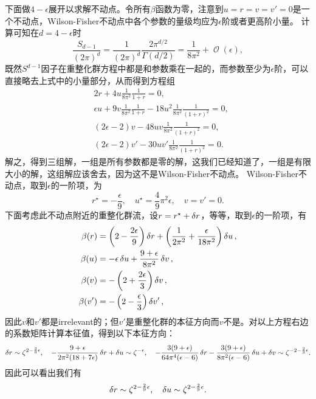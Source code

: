 \documentclass[hyperref, UTF8, a4paper]{ctexart}
\DeclareMathOperator{\bigO}{\mathcal{O}}
\begin{document}
下面做$4-\epsilon$展开以求解不动点。令所有$\beta$函数为零，注意到$u=r=v=v'=0$是一个不动点，Wilson-Fisher不动点中各个参数的量级均应为$\epsilon$阶或者更高阶小量。
计算可知在$d=4-\epsilon$时
\[
    \frac{S_{d-1}}{(2\pi)^d} = \frac{1}{(2\pi)^d} \frac{2 \pi^{d/2}}{\Gamma(d/2)} = \frac{1}{8 \pi^2} + \bigO(\epsilon),
\]
既然$S^{d-1}$因子在重整化群方程中都是和参数乘在一起的，而参数至少为$\epsilon$阶，可以直接略去上式中的小量部分，从而得到方程组
\[
    \begin{aligned}
        &2 r + 4u \frac{1}{8\pi^2} \frac{1}{1+r} = 0, \\
        &\epsilon u + 9 v \frac{1}{8\pi^2} \frac{1}{1+r} - 18 u^2 \frac{1}{8\pi^2} \frac{1}{(1+r)^2} = 0, \\
        &(2\epsilon-2) v - 48 uv \frac{1}{8\pi^2} \frac{1}{(1+r)^2} = 0, \\
        &(2\epsilon-2) v' - 30 u v' \frac{1}{8\pi^2} \frac{1}{(1+r)^2} = 0.
    \end{aligned}
\]
解之，得到三组解，一组是所有参数都是零的解，这我们已经知道了，一组是有限大小的解，这组解应该舍去，因为这不是Wilson-Fisher不动点。
Wilson-Fisher不动点，取到$\epsilon$的一阶项，为
\begin{equation}
    r^\star = - \frac{\epsilon}{9}, \quad u^\star = \frac{4}{9} \pi^2 \epsilon, \quad v = v' = 0.
\end{equation}
下面考虑此不动点附近的重整化群流，设$r = r^\star + \var{r}$，等等，取到$\epsilon$的一阶项，有
\[
    \begin{aligned}
        \beta(r) &= \left( 2 - \frac{2\epsilon}{9} \right) \var{r} + \left( \frac{1}{2\pi^2} + \frac{\epsilon}{18 \pi^2} \right) \var{u}, \\
        \beta(u) &= - \epsilon \var{u} + \frac{9 + \epsilon}{8 \pi^2} \var{v}, \\
        \beta(v) &= - \left( 2 + \frac{2 \epsilon}{3} \right) \var{v}, \\
        \beta(v') &= - \left( 2 - \frac{\epsilon}{3} \right) \var{v'},
    \end{aligned}
\]
因此$v$和$v'$都是irrelevant的；但$v'$是重整化群的本征方向而$v$不是。对以上方程右边的系数矩阵计算本征值，得到以下本征方向：
\[
    \var{r} \sim \zeta^{2 - \frac{2}{9} \epsilon}, \quad - \frac{9 + \epsilon}{2\pi^2 (18 + 7 \epsilon)} \var{r} + \var{u} \sim \zeta^{-\epsilon}, \quad - \frac{3(9+\epsilon)}{64\pi^4(\epsilon-6)} \var{r} - \frac{3(9+\epsilon)}{8\pi^2(\epsilon-6)} \var{u} + \var{v} \sim \zeta^{-2-\frac{2}{3} \epsilon}.
\]
因此可以看出我们有
\begin{equation}
    \var{r} \sim \zeta^{2-\frac{2}{9}\epsilon}, \quad \var{u} \sim \zeta^{2 - \frac{2}{9}\epsilon}.
\end{equation}
\end{document}

